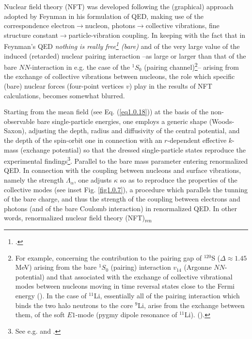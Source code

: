 Nuclear field theory (NFT) was developed following the (graphical) approach adopted by Feynman in his formulation of QED, making use of the correspondence electron$\to$nucleon, photons$\to$collective vibrations, fine structure constant$\to$particle-vibration coupling. In keeping with the  fact that in Feynman's QED \textit{nothing is really free\footnote{\cite{Feynman:75}.} (bare)} and of the very large value of the induced (retarded) nuclear pairing interaction --as large or larger than that of the bare $NN$-interaction in e.g. the case of the $^1S_0$ (pairing channel)\footnote{For example, concerning the contribution to the pairing gap of $^{120}$S ($\Delta\approx1.45$ MeV) arising from the bare $^1S_0$ (pairing) interaction $v_{14}$ (Argonne $NN$-potential) and that associated with the exchange of collective vibrational modes between nucleons moving in time reversal states close to the Fermi energy (\cite{Idini:15}). In the case of $^{11}$Li, essentially all of the pairing interaction which binds the two halo neutrons to the core $^9$Li, arise from the exchange between them, of the soft $E1$-mode (pygmy dipole resonance  of $^{11}$Li). (\cite{Barranco:01,Broglia:19}). }-- arising from the exchange of collective vibrations between nucleons, the role which specific (bare) nuclear forces (four-point vertices $v$) play in the results of NFT calculations, becomes somewhat blurred. 


Starting from the mean field (see Eq. (\ref{eq1.0.18})) at the basis of the non-observable bare single-particle energies, one employs a generic shape (Woods-Saxon), adjusting the depth, radius and diffusivity of the central potential, and the depth of the spin-orbit one in  connection with an $r$-dependent effective $k$-mass (exchange potential) so that the dressed single-particle states reproduce the experimental findings\footnote{See e.g. \cite{Barranco:17} and \cite{Barranco:20}.}. Parallel to the bare mass parameter entering renormalized QED.
In connection with the coupling between nucleons and surface vibrations, namely the strength $\Lambda_\alpha$, one adjusts $\kappa$ so as to reproduce the properties of the collective modes (see inset Fig. \ref{fig1.0.7}), a procedure which parallels the tunning of the bare charge, and thus the strength of the coupling between electrons and photons (and of the bare Coulomb interaction) in renormalized QED. In other words, renormalized nuclear field theory (NFT)$_{\text{ren}}$


